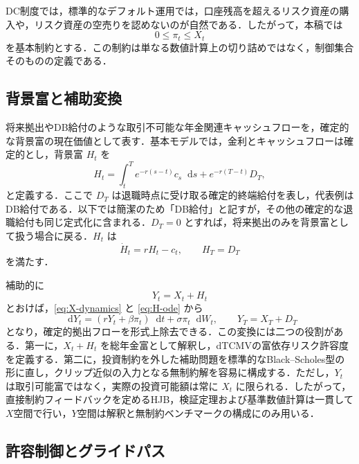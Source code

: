 \documentclass[10pt,a4paper]{article}
\theoremstyle{plain}
\theoremstyle{definition}
\newcommand{\dd}{\mathop{}\!\mathrm{d}}
\begin{document}
DC制度では，標準的なデフォルト運用では，口座残高を超えるリスク資産の購入や，リスク資産の空売りを認めないのが自然である．したがって，本稿では
\begin{equation}
  0\leq\pi_t\leq X_t
  \label{eq:dc-constraint-x}
\end{equation}
を基本制約とする．この制約は単なる数値計算上の切り詰めではなく，制御集合そのものの定義である．

\subsection{背景富と補助変換}

将来拠出やDB給付のような取引不可能な年金関連キャッシュフローを，確定的な背景富の現在価値として表す．基本モデルでは，金利とキャッシュフローは確定的とし，背景富 $H_t$ を
\begin{equation}
  H_t=\int_t^T e^{-r(s-t)}c_s\dd s+e^{-r(T-t)}D_T,
  \label{eq:H-def}
\end{equation}
と定義する．ここで $D_T$ は退職時点に受け取る確定的終端給付を表し，代表例はDB給付である．以下では簡潔のため「DB給付」と記すが，その他の確定的な退職給付も同じ定式化に含まれる．$D_T=0$ とすれば，将来拠出のみを背景富として扱う場合に戻る．$H_t$ は
\begin{equation}
  \dot H_t=rH_t-c_t,
  \qquad H_T=D_T
  \label{eq:H-ode}
\end{equation}
を満たす．

補助的に
\begin{equation}
  Y_t=X_t+H_t
  \label{eq:Y-def}
\end{equation}
とおけば，\eqref{eq:X-dynamics} と \eqref{eq:H-ode} から
\begin{equation}
  \dd Y_t=(rY_t+\beta\pi_t)\dd t+\sigma\pi_t\dd W_t,
  \qquad Y_T=X_T+D_T
  \label{eq:Y-dynamics}
\end{equation}
となり，確定的拠出フローを形式上除去できる．この変換には二つの役割がある．第一に，$X_t+H_t$ を総年金富として解釈し，dTCMVの富依存リスク許容度を定義する．第二に，投資制約を外した補助問題を標準的なBlack--Scholes型の形に直し，クリップ近似の入力となる無制約解を容易に構成する．ただし，$Y_t$ は取引可能富ではなく，実際の投資可能額は常に $X_t$ に限られる．したがって，直接制約フィードバックを定めるHJB，検証定理および基準数値計算は一貫して $X$空間で行い，$Y$空間は解釈と無制約ベンチマークの構成にのみ用いる．

\subsection{許容制御とグライドパス}
\label{sec:admissible-glide}
\end{document}

